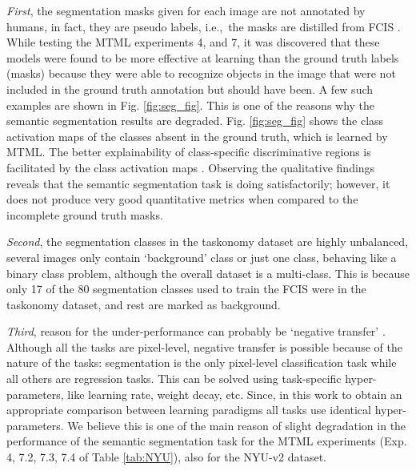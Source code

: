 \documentclass[conference]{IEEEtran}
\newcommand*{\ie}		{i.e.,\ }
\begin{document}
    \textit{First}, the segmentation masks given for each image are not annotated by humans, in fact, they are pseudo labels, \ie  the masks are distilled from FCIS \cite{8099955}. 
    While testing the \ac{MTML} experiments 4, and 7, it was discovered that these models were found to be more effective at learning than the ground truth labels (masks) because they were able to recognize objects in the image that were not included in the ground truth annotation but should have been.
    A few such examples are shown in Fig. \ref{fig:seg_fig}.
    This is one of the reasons why the semantic segmentation results are degraded.
    Fig. \ref{fig:seg_fig} shows the class activation maps of the classes absent in the ground truth, which is learned by \ac{MTML}.
    The better explainability of class-specific discriminative regions is facilitated by the class activation maps \cite{jacobgilpytorchcam}.
    Observing the qualitative findings reveals that the semantic segmentation task is doing satisfactorily; however, it does not produce very good quantitative metrics when compared to the incomplete ground truth masks.
    
    \textit{Second}, the segmentation classes in the taskonomy dataset are highly unbalanced, several images only contain `background' class or just one class, behaving like a binary class problem, although the overall dataset is a multi-class. This is because only 17 of the 80 segmentation classes used to train the FCIS \cite{8099955} were in the taskonomy dataset, and rest are marked as background. 


    \textit{Third}, reason for the under-performance can probably be `negative transfer' \cite{MTL_rich}.
    Although all the tasks are pixel-level, negative transfer is possible because of the nature of the tasks: segmentation is the only pixel-level classification task while all others are regression tasks. 
    This can be solved using task-specific hyper-parameters, like learning rate, weight decay, etc. 
    Since, in this work to obtain an appropriate comparison between learning paradigms all tasks use identical hyper-parameters. 
    We believe this is one of the main reason of slight degradation in the performance of the semantic segmentation task for the \ac{MTML} experiments (Exp. 4, 7.2, 7.3, 7.4 of Table \ref{tab:NYU}), also for the NYU-v2 dataset.
\end{document}
